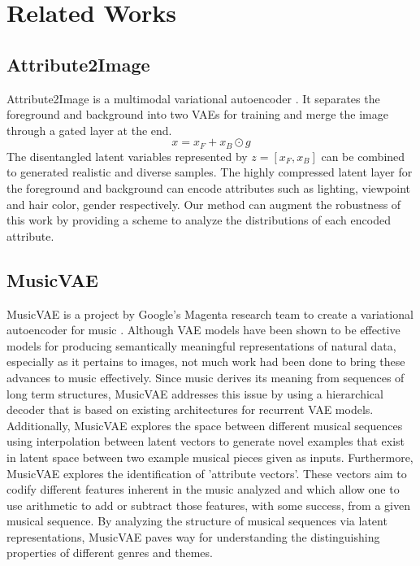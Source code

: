 \documentclass{article}
\begin{document}
\section{Related Works}
\label{sec:related}
\subsection{Attribute2Image}

Attribute2Image is a multimodal variational autoencoder \cite{Yan}. It separates the foreground and background into two VAEs for training and merge the image through a gated layer at the end. 
\begin{equation} 
x=x_F + x_B \odot g
\end{equation}
The disentangled latent variables represented by $z=[x_F, x_B]$ can be combined to generated realistic and diverse samples. The highly compressed latent layer for the foreground and background can encode attributes such as lighting, viewpoint and hair color, gender respectively. Our method can augment the robustness of this work by providing a scheme to analyze the distributions of each encoded attribute.

\subsection{MusicVAE}

MusicVAE is a project by Google's Magenta research team to create a variational autoencoder for music \cite{Roberts}. Although VAE models have been shown to be effective models for producing semantically meaningful representations of natural data, especially as it pertains to images, not much work had been done to bring these advances to music effectively. Since music derives its meaning from sequences of long term structures, MusicVAE addresses this issue by using a hierarchical decoder that is based on existing architectures for recurrent VAE models. Additionally, MusicVAE explores the space between different musical sequences using interpolation between latent vectors to generate novel examples that exist in latent space between two example musical pieces given as inputs. Furthermore, MusicVAE explores the identification of 'attribute vectors'. These vectors aim to codify different features inherent in the music analyzed and which allow one to use arithmetic to add or subtract those features, with some success, from a given musical sequence. By analyzing the structure of musical sequences via latent representations, MusicVAE paves way for understanding the distinguishing properties of different genres and themes.
\end{document}
